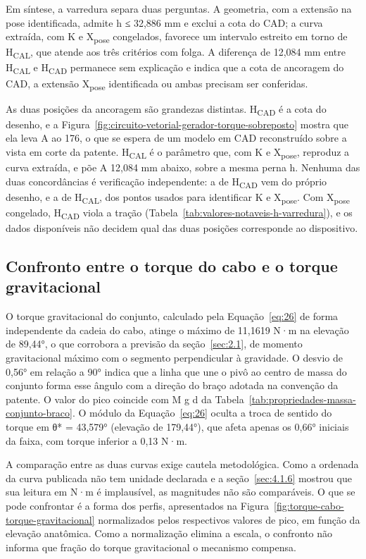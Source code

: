 Em síntese, a varredura separa duas perguntas. A geometria, com a extensão na pose identificada, admite h ≤ 32,886 mm e exclui a cota do CAD; a curva extraída, com K e X\textsubscript{pose} congelados, favorece um intervalo estreito em torno de H\textsubscript{CAL}, que atende aos três critérios com folga. A diferença de 12,084 mm entre H\textsubscript{CAL} e H\textsubscript{CAD} permanece sem explicação e indica que a cota de ancoragem do CAD, a extensão X\textsubscript{pose} identificada ou ambas precisam ser conferidas.

As duas posições da ancoragem são grandezas distintas. H\textsubscript{CAD} é a cota do desenho, e a Figura~\ref{fig:circuito-vetorial-gerador-torque-sobreposto} mostra que ela leva A ao 176, o que se espera de um modelo em CAD reconstruído sobre a vista em corte da patente. H\textsubscript{CAL} é o parâmetro que, com K e X\textsubscript{pose}, reproduz a curva extraída, e põe A 12,084 mm abaixo, sobre a mesma perna h. Nenhuma das duas concordâncias é verificação independente: a de H\textsubscript{CAD} vem do próprio desenho, e a de H\textsubscript{CAL}, dos pontos usados para identificar K e X\textsubscript{pose}. Com X\textsubscript{pose} congelado, H\textsubscript{CAD} viola a tração (Tabela~\ref{tab:valores-notaveis-h-varredura}), e os dados disponíveis não decidem qual das duas posições corresponde ao dispositivo.

\subsection{Confronto entre o torque do cabo e o torque gravitacional}\label{sec:4.1.8}

O torque gravitacional do conjunto, calculado pela Equação~\eqref{eq:26} de forma independente da cadeia do cabo, atinge o máximo de 11,1619 N·m na elevação de 89,44°, o que corrobora a previsão da seção~\ref{sec:2.1}, de momento gravitacional máximo com o segmento perpendicular à gravidade. O desvio de 0,56° em relação a 90° indica que a linha que une o pivô ao centro de massa do conjunto forma esse ângulo com a direção do braço adotada na convenção da patente. O valor do pico coincide com M g d da Tabela~\ref{tab:propriedades-massa-conjunto-braco}. O módulo da Equação~\eqref{eq:26} oculta a troca de sentido do torque em θ* = 43,579° (elevação de 179,44°), que afeta apenas os 0,66° iniciais da faixa, com torque inferior a 0,13 N·m.

A comparação entre as duas curvas exige cautela metodológica. Como a ordenada da curva publicada não tem unidade declarada e a seção~\ref{sec:4.1.6} mostrou que sua leitura em N·m é implausível, as magnitudes não são comparáveis. O que se pode confrontar é a forma dos perfis, apresentados na Figura~\ref{fig:torque-cabo-torque-gravitacional} normalizados pelos respectivos valores de pico, em função da elevação anatômica. Como a normalização elimina a escala, o confronto não informa que fração do torque gravitacional o mecanismo compensa.

